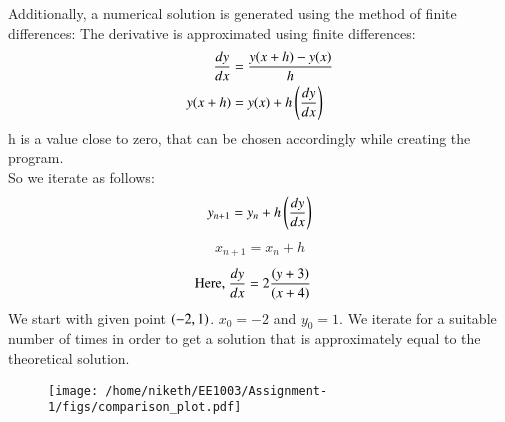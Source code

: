 \documentclass[journal]{IEEEtran}
\numberwithin{equation}{enumi}
\numberwithin{figure}{enumi}
\begin{document}
Additionally, a numerical solution is generated using the method of finite differences:
The derivative is approximated using finite differences:
	\begin{align*}
    \frac{dy}{dx}&=\frac{y(x+h)-y(x)}{h}\\
    y(x+h)&=y(x)+h\left(\frac{dy}{dx}\right)
	\end{align*}
h is a value close to zero, that can be chosen accordingly while creating the program.\\
So we iterate as follows:
	\begin{align*}
		y_{n+1}=y_{n} + h\left(\frac{dy}{dx}\right)
	\end{align*}
	\begin{align*}
		x_{n+1}=x_{n}+h
	\end{align*}
	\begin{align*}
		\text{Here, } \frac{dy}{dx}&=2\frac{\left(y+3\right)}{\left(x+4\right)}
	\end{align*}
We start with given point $\left(-2,1\right)$. $x_{0}=-2$ and $y_{0}=1$. We iterate for a suitable number of times in order to get a solution that is approximately equal to the theoretical solution.
\begin{figure}[!ht]
    \centering
    \texttt{[image: /home/niketh/EE1003/Assignment-1/figs/comparison\_plot.pdf]}
    \caption{}
\end{figure}
\end{document}
